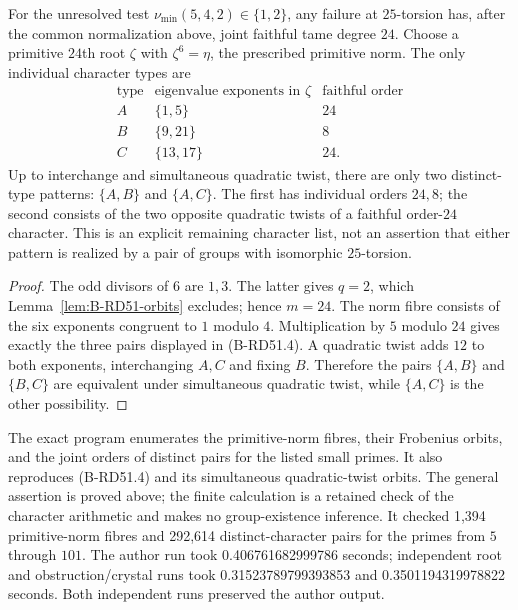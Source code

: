 \begin{corollary}
\label{cor:B-RD51-p5}
For the unresolved test $\nu_{\min}(5,4,2)\in\{1,2\}$,
any failure at $25$-torsion has, after the common normalization
above, joint faithful tame degree $24$.
Choose a primitive $24$th root $\zeta$ with
$\zeta^6=\eta$, the prescribed primitive norm. The only
individual character types are
\[
 \begin{array}{c|c|c}
 \text{type}&\text{eigenvalue exponents in }\zeta&
              \text{faithful order}\\ \hline
 A&\{1,5\}&24\\
 B&\{9,21\}&8\\
 C&\{13,17\}&24.
 \end{array}                                             \tag{B-RD51.4}
\]
Up to interchange and simultaneous quadratic twist, there
are only two distinct-type patterns: $\{A,B\}$ and $\{A,C\}$.
The first has individual orders $24,8$; the second consists
of the two opposite quadratic twists of a faithful order-$24$
character. This is an explicit remaining character list, not
an assertion that either pattern is realized by a pair of groups
with isomorphic $25$-torsion.
\end{corollary}
\begin{proof}
The odd divisors of $6$ are $1,3$. The latter gives $q=2$,
which Lemma~\ref{lem:B-RD51-orbits} excludes; hence $m=24$.
The norm fibre consists of the six exponents congruent to
$1$ modulo $4$. Multiplication by $5$ modulo $24$ gives
exactly the three pairs displayed in (B-RD51.4).
A quadratic twist adds $12$ to both exponents, interchanging
$A,C$ and fixing $B$. Therefore the pairs $\{A,B\}$ and
$\{B,C\}$ are equivalent under simultaneous quadratic twist,
while $\{A,C\}$ is the other possibility.
\end{proof}

\begin{remark}
\label{rem:B-RD51-scope}
The exact program
enumerates the primitive-norm fibres, their Frobenius orbits,
and the joint orders of distinct pairs for the listed small
primes. It also reproduces (B-RD51.4) and its simultaneous
quadratic-twist orbits. The general assertion is proved above;
the finite calculation is a retained check of the character
arithmetic and makes no group-existence inference. It checked
1,394 primitive-norm fibres and 292,614 distinct-character pairs
for the primes from $5$ through $101$. The author run took
0.406761682999786 seconds; independent root and
obstruction/crystal runs took 0.31523789799393853 and
0.3501194319978822 seconds. Both independent runs preserved
the author output.
\end{remark}


